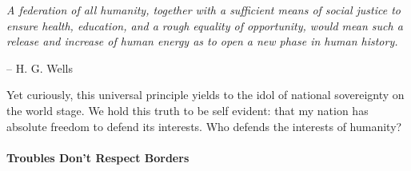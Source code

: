 \documentclass[11pt,a4paper]{article}
\begin{document}
\begin{multicols}{2}
\begin{shaded*}
\noindent \textit{A federation of all humanity, together with a sufficient means of social justice to ensure health, education, and a rough equality of opportunity, would mean such a release and increase of human energy as to open a new phase in human history.}
\begin{flushright}
-- H. G. Wells
\end{flushright}
\vspace{-12pt}
\end{shaded*}

\noindent Yet curiously, this universal principle yields to the idol of national sovereignty on the world stage.
We hold this truth to be self evident: that my nation has absolute freedom to defend its interests.  
Who defends the interests of humanity?

\end{multicols}
\paragraph{Troubles Don't Respect Borders}
\end{document}
